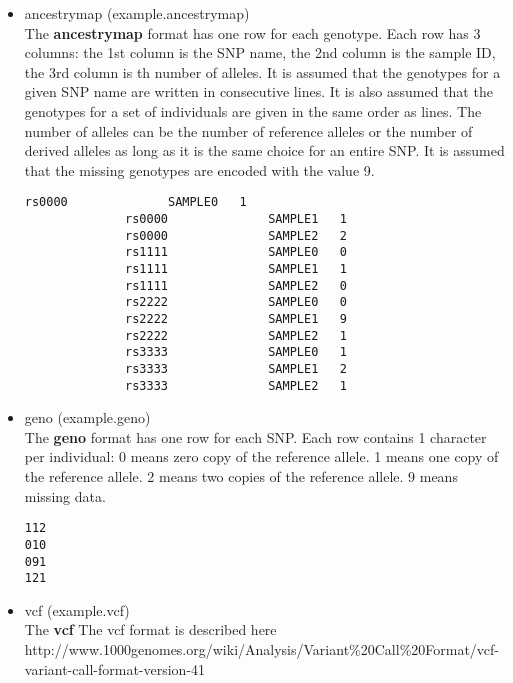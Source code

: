 \documentclass[10pt,a4paper]{article}
\begin{document}
\begin{itemize}
\item ancestrymap (example.ancestrymap)\\
The {\bf ancestrymap} format has one row for each genotype. Each row has 3 columns: the 1st column is the SNP name, the 2nd column is the sample ID, the 3rd column is th number of alleles. It is assumed that the genotypes for a given SNP name are written in consecutive lines. It is also assumed that the genotypes for a set of individuals are given in the same order as lines. The number of alleles can be the number of reference alleles or the number of derived alleles as long as it is the same choice for an entire SNP. It is assumed that the missing genotypes are encoded with the value 9.
\begin{center}
\begin{Verbatim}[frame=single]
              rs0000              SAMPLE0   1
              rs0000              SAMPLE1   1
              rs0000              SAMPLE2   2
              rs1111              SAMPLE0   0
              rs1111              SAMPLE1   1
              rs1111              SAMPLE2   0
              rs2222              SAMPLE0   0
              rs2222              SAMPLE1   9
              rs2222              SAMPLE2   1
              rs3333              SAMPLE0   1
              rs3333              SAMPLE1   2
              rs3333              SAMPLE2   1
\end{Verbatim}
\end{center}

\item geno (example.geno)\\
The {\bf geno} format has one row for each SNP.
Each row contains 1 character per individual:
        0 means zero copy of the reference allele.
        1 means one copy of the reference allele.
        2 means two copies of the reference allele.
        9 means missing data.

\begin{center}
\begin{Verbatim}[frame=single]
112
010
091
121
\end{Verbatim}
\end{center}

\item vcf (example.vcf)\\
The {\bf vcf} The vcf format is described here\\
http://www.1000genomes.org/wiki/Analysis/Variant\%20Call\%20Format/vcf-variant-call-format-version-41


\end{itemize}
\end{document}
